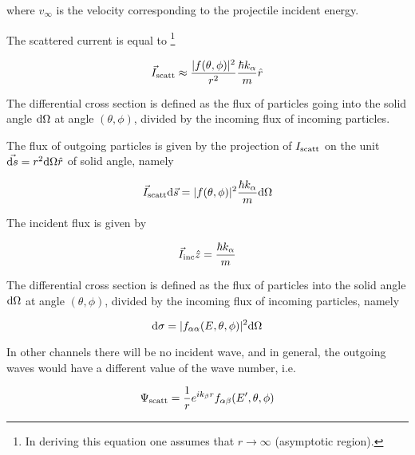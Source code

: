 \noindent where $v_{\infty}$ is the velocity corresponding to the projectile incident energy.

The scattered current is equal to \footnote{In deriving this equation one assumes that $r \rightarrow \infty$ (asymptotic region).}

\begin{equation}
\vec{I}_{\rm scatt} \approx \frac{|f(\theta,\phi)|^2}{r^2} \frac{\hbar k_{\alpha}}{m} \hat{r}
\end{equation}

The differential cross section is defined as the flux of particles going into the solid angle ${\rm d}\Omega$ at angle $(\theta,\phi)$, divided by the incoming flux of incoming particles.

The flux of outgoing particles is given by the projection of $I_{\rm scatt}$ on the unit $\vec{{\rm d}s} = r^2 {\rm d}\Omega \hat{r}$ of solid angle, namely

\begin{equation}
\vec{I}_{\rm scatt} {\rm d}\vec{s} = |f(\theta,\phi)|^2 \frac{\hbar k_{\alpha}}{m} {\rm d}\Omega
\end{equation}

\noindent The incident flux is given by

\begin{equation}
\vec{I}_{\rm inc} \hat{z} = \frac{\hbar k_{\alpha}}{m}
\end{equation}

\noindent The differential cross section is defined as the flux of particles into the solid angle ${\rm d}\Omega$ at angle $(\theta,\phi)$, divided by the incoming flux of incoming particles, namely

\begin{equation}
{\rm d}\sigma = |f_{\alpha \alpha}(E,\theta,\phi)|^2 {\rm d}\Omega
\end{equation}

In other channels there will be no incident wave, and in general, the outgoing waves would have a different value of the wave number, i.e.

\begin{equation}
\Psi_{\rm scatt} = \frac{1}{r} e^{i k_{\beta} r} f_{\alpha \beta} (E',\theta,\phi)
\end{equation}

